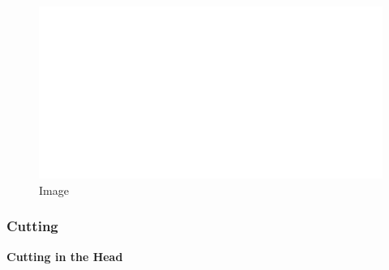 \begin{figure}
\centering
\includegraphics{./images/combat03.svg}
\caption{Image}
\end{figure}

\hypertarget{cutting}{%
\subsubsection{Cutting}\label{cutting}}

\textbf{Cutting in the Head}

